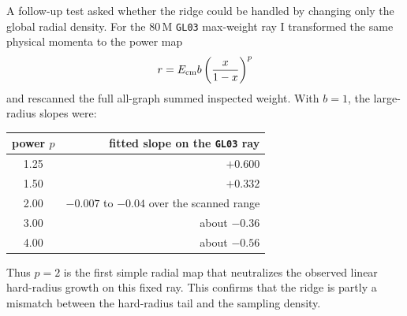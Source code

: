 \documentclass[11pt]{article}
\begin{document}
A follow-up test asked whether the ridge could be handled by changing only the
global radial density.  For the \(80\,\mathrm{M}\) \texttt{GL03} max-weight
ray I transformed the same physical momenta to the power map
\[
  r=E_{\rm cm} b \left(\frac{x}{1-x}\right)^p
\]
and rescanned the full all-graph summed inspected weight.  With \(b=1\), the
large-radius slopes were:
\begin{center}
\scriptsize
\begin{tabular}{cr}
\toprule
power \(p\) & fitted slope on the \texttt{GL03} ray\\
\midrule
1.25 & \(+0.600\)\\
1.50 & \(+0.332\)\\
2.00 & \(-0.007\) to \(-0.04\) over the scanned range\\
3.00 & about \(-0.36\)\\
4.00 & about \(-0.56\)\\
\bottomrule
\end{tabular}
\end{center}
Thus \(p=2\) is the first simple radial map that neutralizes the observed
linear hard-radius growth on this fixed ray.  This confirms that the ridge is
partly a mismatch between the hard-radius tail and the sampling density.
\end{document}
